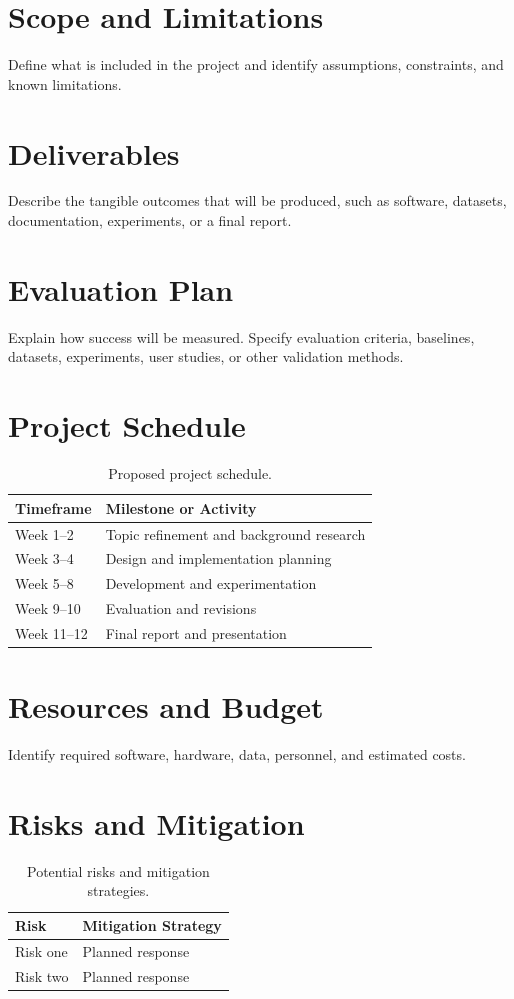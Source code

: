\documentclass[11pt]{article}
\begin{document}
\section{Scope and Limitations}
Define what is included in the project and identify assumptions, constraints, and
known limitations.

\section{Deliverables}
Describe the tangible outcomes that will be produced, such as software, datasets,
documentation, experiments, or a final report.

\section{Evaluation Plan}
Explain how success will be measured. Specify evaluation criteria, baselines,
datasets, experiments, user studies, or other validation methods.

\section{Project Schedule}
\begin{table}[ht]
	\centering
	\begin{tabular}{p{} p{}}
		\toprule
		\textbf{Timeframe} & \textbf{Milestone or Activity} \\
		\midrule
		Week 1--2 & Topic refinement and background research \\
		Week 3--4 & Design and implementation planning \\
		Week 5--8 & Development and experimentation \\
		Week 9--10 & Evaluation and revisions \\
		Week 11--12 & Final report and presentation \\
		\bottomrule
	\end{tabular}
	\caption{Proposed project schedule.}
\end{table}

\section{Resources and Budget}
Identify required software, hardware, data, personnel, and estimated costs.

\section{Risks and Mitigation}
\begin{table}[ht]
	\centering
	\begin{tabular}{p{} p{}}
		\toprule
		\textbf{Risk} & \textbf{Mitigation Strategy} \\
		\midrule
		Risk one & Planned response \\
		Risk two & Planned response \\
		\bottomrule
	\end{tabular}
	\caption{Potential risks and mitigation strategies.}
\end{table}
\end{document}
